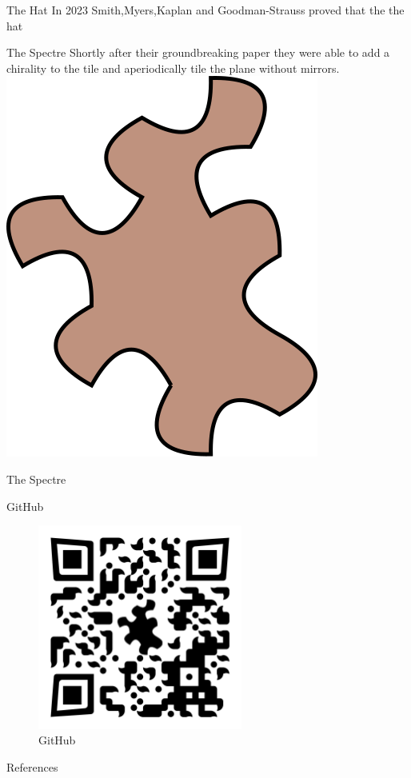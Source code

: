 \documentclass{beamer}
\theoremstyle{definition}
\begin{document}
\begin{frame}{The Hat}
    In 2023 Smith,Myers,Kaplan and Goodman-Strauss proved that the the hat
\end{frame}

\begin{frame}{The Spectre}
    Shortly after their groundbreaking paper they were able to add a chirality to the tile and aperiodically tile the plane without mirrors.
    \includegraphics[width=0.3\linewidth]{images/Spectre_aperiodic_monotile_single.svg.png}
\end{frame}

\begin{frame}{The Spectre}
    
\end{frame}

\begin{frame}{GitHub}
    \begin{figure}
        \centering
        \includegraphics[width=0.6\textwidth]{images/qr-codes/tilling-presentation-github.png}
        \caption{GitHub}
        \label{fig:github-qrcode}
    \end{figure}
\end{frame}

\begin{frame}{References}
    
\end{frame}
\end{document}
